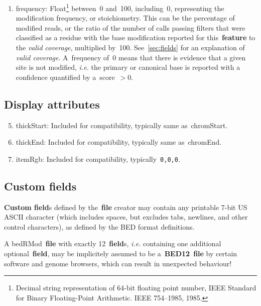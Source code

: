 \documentclass[11pt]{article}
\begin{document}
\begin{enumerate}
\item \textsf{frequency}: Float\footnote{Decimal string representation of 64-bit floating point number, IEEE Standard for Binary Floating-Point Arithmetic. IEEE 754–1985, 1985.} between~0 and~100, including~0, representing the modification frequency, or stoichiometry. This can be the percentage of modified reads, or the ratio of the number of calls passing filters that were classified as a residue with the base modification reported for this~\textbf{feature} to the \emph{valid coverage}, multiplied by~100. See~\autoref{sec:fields} for an explanation of \emph{valid coverage}. A~\textsf{frequency} of~0 means that there is evidence that a given site is not modified, \textit{i.e.} the primary or canonical base is reported with a confidence quantified by a~\textsf{score}~$>$0.
\end{enumerate}

\subsection{Display attributes}
\begin{enumerate}
  \setcounter{enumi}{4}

\item \textsf{thickStart}: Included for compatibility, typically same as~\textsf{chromStart}.

\item \textsf{thickEnd}: Included for compatibility, typically same as~\textsf{chromEnd}.

\item \textsf{itemRgb}: Included for compatibility, typically~\texttt{0,0,0}.

\end{enumerate}

\subsection{Custom fields}\label{sec:custom_fields}

\textbf{Custom field}s defined by the~\textbf{file} creator may contain any printable 7-bit US \ac{ASCII} character (which includes spaces, but excludes tabs, newlines, and other control characters), as defined by the \ac{BED} format definitions.

A \acs{bedRMod}~\textbf{file} with exactly 12~\textbf{field}s, \textit{i.e.} containing one additional optional~\textbf{field}, may be implicitely 
assumed to be a~\textbf{BED12}~\textbf{file} by certain software and genome browsers, which can result in unexpected behaviour! 
\end{document}
